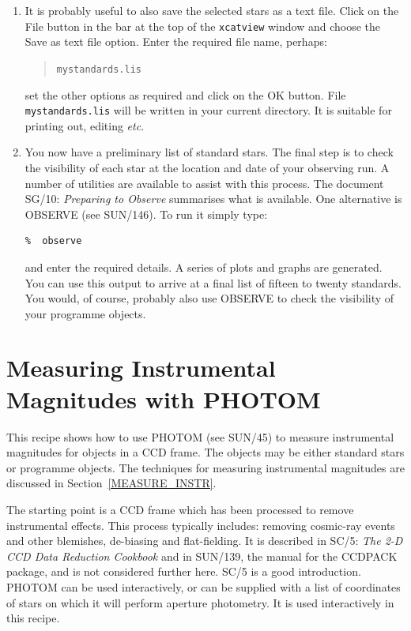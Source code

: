 \documentclass[twoside,11pt]{article}
\newcommand{\xref}[3]{#1}
\newcommand{\xlabel}[1]{}
\begin{document}
\begin{enumerate}
  \item It is probably useful to also save the selected stars as a
   text file.  Click on the {\sf File} button in the bar at the top of
   the {\tt xcatview} window and choose the {\sf Save as text file}
   option.  Enter the required file name, perhaps:

  \begin{verse}
   {\tt mystandards.lis}
  \end{verse}

   set the other options as required and click on the {\sf OK} button.
   File {\tt mystandards.lis} will be written in your current directory.
   It is suitable for printing out, editing \emph{etc}.

  \item You now have a preliminary list of standard stars.  The final
   step is to check the visibility of each star at the location and
   date of your observing run.  A number of utilities are available to
   assist with this process.  The document \xref{SG/10: {\it Preparing
   to Observe}}{sg10}{}\/\cite{SG10} summarises what is available.  One
   alternative is OBSERVE (see \xref{SUN/146}{sun146}{}\cite{SUN146}).
   To run it simply type:

\begin{verbatim}
%  observe
\end{verbatim}

   and enter the required details.  A series of plots and graphs are
   generated.  You can use this output to arrive at a final list of
   fifteen to twenty standards.  You would, of course, probably also
   use OBSERVE to check the visibility of your programme objects.

\end{enumerate}



\newpage
\section{\xlabel{PHOTOM_RECIP}\label{PHOTOM_RECIP}Measuring Instrumental
Magnitudes with PHOTOM}

This recipe shows how to use PHOTOM (see \xref{SUN/45}{sun45}{}\cite{SUN45})
to measure instrumental magnitudes for objects in a CCD frame.  The
objects may be either standard stars or programme objects.  The
techniques for measuring instrumental magnitudes are discussed in
Section~\ref{MEASURE_INSTR}.

The starting point is a CCD frame which has been processed to remove
instrumental effects.  This process typically includes: removing
cosmic-ray events and other blemishes, de-biasing and flat-fielding.  It
is described in \xref{SC/5: {\it The 2-D CCD Data Reduction
Cookbook}}{sc5}{}\/\cite{SC5} and in \xref{SUN/139}{sun139}{}\cite{SUN139},
the manual for the CCDPACK package, and is not considered further here.
SC/5 is a good introduction.  PHOTOM can be used interactively, or can be
supplied with a list of coordinates of stars on which it will perform
aperture photometry.  It is used interactively in this recipe.
\end{document}
